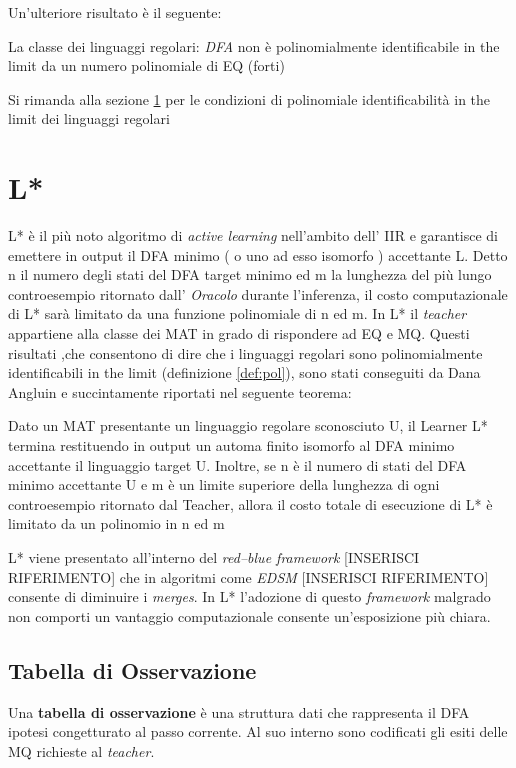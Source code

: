 Un'ulteriore risultato è il seguente: 
\begin{teorema}
\label{teo:noe}
La classe dei linguaggi regolari: \textit{DFA}  non è polinomialmente identificabile in the limit da un numero polinomiale di \ac{EQ} (forti)
\end{teorema}
Si rimanda alla sezione \ref{sec:lstar} per le condizioni di polinomiale identificabilità in the limit dei linguaggi regolari
\section{L*}
\label{sec:lstar}
L* è il più noto algoritmo di \textit{active learning} nell'ambito dell' \ac{IIR} e garantisce di emettere in output il DFA minimo ( o uno ad esso isomorfo ) accettante \ac{L}. Detto n il numero degli stati del DFA target minimo ed m la lunghezza del più lungo controesempio ritornato dall' \textit{Oracolo} durante l'inferenza, il costo computazionale di L* sarà limitato da una funzione polinomiale di n ed m. In L* il \textit{teacher} appartiene alla classe dei \ac{MAT} in grado di rispondere ad \ac{EQ} e \ac{MQ}. Questi risultati ,che consentono di dire che i linguaggi regolari sono polinomialmente identificabili in the limit (definizione \ref{def:pol}),  sono stati conseguiti da Dana Angluin \cite{Angluin87} e succintamente riportati nel seguente teorema:
\begin{teorema}
Dato un \ac{MAT}  presentante un linguaggio regolare sconosciuto U, il Learner L* termina restituendo in output un automa finito isomorfo al DFA minimo accettante  il linguaggio target U. Inoltre, se n è il numero di stati del DFA minimo accettante U e  m è un limite superiore della lunghezza di ogni controesempio ritornato dal Teacher, allora il costo totale di esecuzione di L* è limitato da un polinomio in n ed m 
\end{teorema}

L* viene presentato all'interno del \textit{red--blue framework} [INSERISCI RIFERIMENTO] che in algoritmi come \textit{EDSM} [INSERISCI RIFERIMENTO] consente di diminuire i \textit{merges}. In L* l'adozione di questo \textit{framework} malgrado non comporti un vantaggio computazionale consente un'esposizione più chiara.  
\subsection{Tabella di Osservazione}
\label{sub:obt}
Una \textbf{tabella di osservazione} è una struttura dati che rappresenta il DFA ipotesi congetturato al passo corrente. Al suo interno sono codificati gli esiti delle \ac{MQ} richieste al \textit{teacher}.

